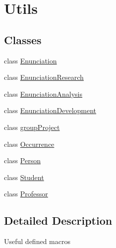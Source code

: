 \hypertarget{group___utils}{}\section{Utils}
\label{group___utils}
\subsection*{Classes}
\begin{DoxyCompactItemize}
\item 
class \hyperlink{class_enunciation}{Enunciation}
\item 
class \hyperlink{class_enunciation_research}{Enunciation\+Research}
\item 
class \hyperlink{class_enunciation_analysis}{Enunciation\+Analysis}
\item 
class \hyperlink{class_enunciation_development}{Enunciation\+Development}
\item 
class \hyperlink{classgroup_project}{group\+Project}
\item 
class \hyperlink{class_occurrence}{Occurrence}
\item 
class \hyperlink{class_person}{Person}
\item 
class \hyperlink{class_student}{Student}
\item 
class \hyperlink{class_professor}{Professor}
\end{DoxyCompactItemize}


\subsection{Detailed Description}
Useful defined macros 
